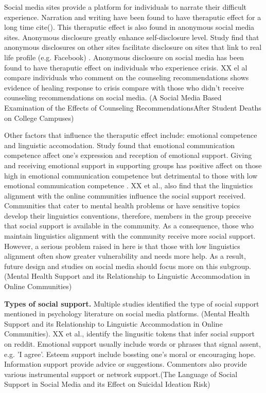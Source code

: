 Social media sites provide a platform for individuals to narrate their difficult experience. Narration and writing have been found to have theraputic effect for a long time cite(). This theraputic effect is also found in anonymous social media sites. Anonymous disclosure greatly enhance self-disclosure level. Study find that anonymous disclosures on other sites facilitate disclosure on sites that link to real life profile (e.g. Facebook) \cite{andalibi2018announcing}. Anonymous disclosure on social media has been found to have theraputic effect on individuals who experience crisis. XX el al compare individuals who comment on the counseling recommendations shows evidence of healing response to crisis compare with those who didn't receive counseling recommendations on social media.  (A Social Media Based Examination of the Effects of Counseling RecommendationsAfter Student Deaths on College Campuses) 

Other factors that influence the theraputic effect include: emotional competence and linguistic accomodation. Study found that emotional communication competence affect one's expression and reception of emotional support. Giving and receiving emotional support in supporting groups has positive affect on those high in emotional communication competence but detrimental to those with low emotional communication competence \cite{yoo2014giving}. XX et al., also find that the linguistics alignment with the online communities influence the social support received. Communities that cater to mental health problems or have sensitive topics develop their linguistics conventions, therefore, members in the group preceive that social support is available in the community. As a consequence, those who maintain linguistics alignment with the community receive more social support. However, a serious problem raised in here is that those with low linguistics alignment often show greater vulnerability and needs more help. As a result, future design and studies on social media should focus more on this subgroup. (Mental Health Support and its Relationship to Linguistic Accommodation in Online Communities)

\textbf{Types of social support.} Multiple studies identified the type of social support mentioned in psychology literature on social media platforms. \cite{yoo2014giving}(Mental Health Support and its Relationship to Linguistic Accommodation in Online Communities). XX et al., identify the lingusitic tokens that infer social support on reddit. Emotional support usually include words or phrases that signal assent, e.g. 'I agree'. Esteem support include bossting one's moral or encouraging hope. Information support provide advice or suggestions. Commentors also provide various instrumental support or network support.(The Language of Social Support in Social Media and its Effect on Suicidal Ideation Risk)

